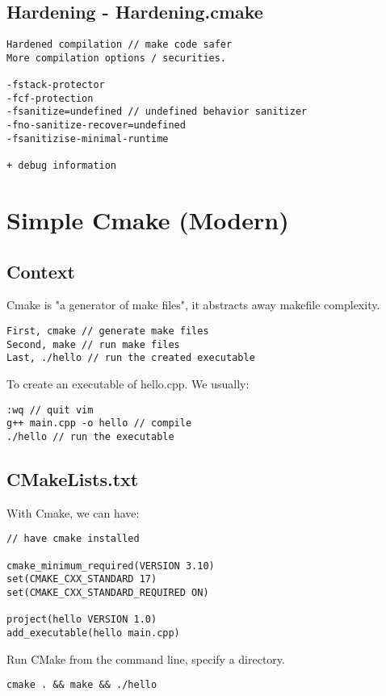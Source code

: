 \subsection{Hardening - Hardening.cmake}

\begin{verbatim}
Hardened compilation // make code safer
More compilation options / securities.

-fstack-protector
-fcf-protection
-fsanitize=undefined // undefined behavior sanitizer
-fno-sanitize-recover=undefined
-fsanitizise-minimal-runtime

+ debug information 
\end{verbatim}

\section{Simple Cmake (Modern)}

\subsection{Context}

Cmake is "a generator of make files", it abstracts away makefile complexity.

\begin{verbatim}
First, cmake // generate make files
Second, make // run make files
Last, ./hello // run the created executable
\end{verbatim}

To create an executable of hello.cpp. We usually:
\begin{verbatim}
:wq // quit vim
g++ main.cpp -o hello // compile 
./hello // run the executable
\end{verbatim}

\subsection{CMakeLists.txt}

With Cmake, we can have:

\begin{verbatim}
// have cmake installed

cmake_minimum_required(VERSION 3.10)
set(CMAKE_CXX_STANDARD 17)
set(CMAKE_CXX_STANDARD_REQUIRED ON)

project(hello VERSION 1.0)
add_executable(hello main.cpp)
\end{verbatim}

Run CMake from the command line, specify a directory.
\begin{verbatim}
cmake . && make && ./hello
\end{verbatim}


